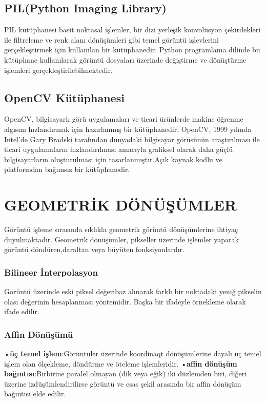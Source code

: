 \subsection{PIL(Python Imaging Library)}
PIL kütüphanesi basit noktasal işlemler, bir dizi yerleşik konvolüsyon çekirdekleri ile filtreleme ve renk alanı dönüşümleri gibi temel görüntü işlevlerini gerçekleştirmek için kullanılan bir kütüphanedir. Python programlama dilinde bu kütüphane kullanılarak görüntü dosyaları üzerinde değiştirme ve dönüştürme işlemleri gerçekleştirilebilmektedir. \\
\subsection{OpenCV Kütüphanesi}
OpenCV, bilgisayarlı görü uygulamaları ve ticari ürünlerde makine öğrenme algısını hızlandırmak için hazırlanmış bir kütüphanedir. OpenCV, 1999 yılında Intel'de Gary Bradski tarafından dünyadaki bilgisayar görüsünün araştırılması ile ticari uygulamaların hızlandırılması amacıyla grafiksel olarak daha güçlü bilgisayarların oluşturulması için tasarlanmıştır.Açık kaynak kodlu ve platformdan bağımsız bir kütüphanedir. \\

\section{GEOMETRİK DÖNÜŞÜMLER}
Görüntü işleme sırasında sıklıkla geometrik görüntü dönüşümlerine ihtiyaç duyulmaktadır. Geometrik dönüşümler, pikseller üzerinde işlemler yaparak görüntü döndüren,daraltan veya büyüten fonksiyonlardır.
\newpage
 \subsubsection{Bilineer İnterpolasyon}
Görüntü üzerinde eski piksel değeribaz alınarak farklı bir noktadaki yeniğ pikselin olası değerinin hesaplanması yöntemidir. Başka bir ifadeyle örnekleme olarak ifade edilir. 
\subsubsection{Affin Dönüşümü}
•\textbf{üç temel işlem}:Görüntüler üzerinde koordinaqt dönüşümlerine dayalı üç temel işlem olan ölçekleme, döndürme ve öteleme işlemleridir.
•\textbf{affin dönüşüm bağıntısı}:Birbirine paralel olmayan (dik veya eğik) iki düzlemden biri, diğeri üzerine izdüşümlendirilirse görüntü ve esas şekil arasında bir affin dönüşüm bağıntısı elde edilir.
